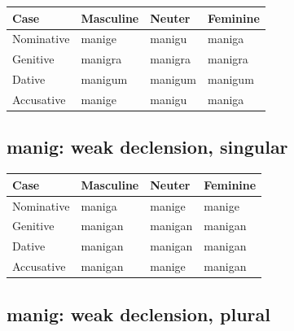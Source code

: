 \par\begingroup
\fontsize{10.5}{13.2}\selectfont
\setlength{\LTleft}{0pt}\setlength{\LTright}{\fill}
\noindent
\begin{tabular}{@{}>{\raggedright\arraybackslash}p{28.89mm}>{\raggedright\arraybackslash}p{28.89mm}>{\raggedright\arraybackslash}p{28.89mm}>{\raggedright\arraybackslash}p{28.89mm}@{}}
\toprule
\textbf{Case} & \textbf{Masculine} & \textbf{Neuter} & \textbf{Feminine} \\
\midrule
Nominative & manige & manigu & maniga \\
Genitive & manigra & manigra & manigra \\
Dative & manigum & manigum & manigum \\
Accusative & manige & manigu & maniga \\
\bottomrule
\end{tabular}
\par\endgroup

\subsection*{manig: weak declension, singular}

\par\begingroup
\fontsize{10.5}{13.2}\selectfont
\setlength{\LTleft}{0pt}\setlength{\LTright}{\fill}
\noindent
\begin{tabular}{@{}>{\raggedright\arraybackslash}p{28.89mm}>{\raggedright\arraybackslash}p{28.89mm}>{\raggedright\arraybackslash}p{28.89mm}>{\raggedright\arraybackslash}p{28.89mm}@{}}
\toprule
\textbf{Case} & \textbf{Masculine} & \textbf{Neuter} & \textbf{Feminine} \\
\midrule
Nominative & maniga & manige & manige \\
Genitive & manigan & manigan & manigan \\
Dative & manigan & manigan & manigan \\
Accusative & manigan & manige & manigan \\
\bottomrule
\end{tabular}
\par\endgroup

\subsection*{manig: weak declension, plural}

